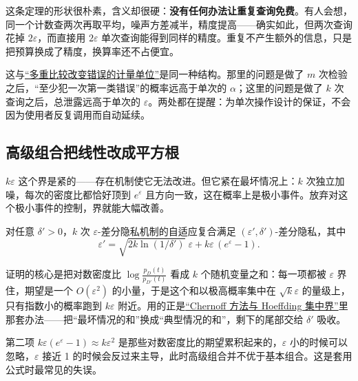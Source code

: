 这条定理的形状很朴素，含义却很硬：\textbf{没有任何办法让重复查询免费}。有人会想，同一个计数查两次再取平均，噪声方差减半，精度提高——确实如此，但两次查询花掉 \(2\varepsilon\)，而直接用 \(2\varepsilon\) 单次查询能得到同样的精度。重复不产生额外的信息，只是把预算换成了精度，换算率还不占便宜。

这与\hyperref[sec:11-Mathematical-Statistics/05-Hypothesis-Testing/04]{``多重比较改变错误的计量单位''}是同一种结构。那里的问题是做了 \(m\) 次检验之后，``至少犯一次第一类错误''的概率远高于单次的 \(\alpha\)；这里的问题是做了 \(k\) 次查询之后，总泄露远高于单次的 \(\varepsilon\)。两处都在提醒：为单次操作设计的保证，不会因为使用者反复调用而自动延续。

\subsection{高级组合把线性改成平方根}

\(k\varepsilon\) 这个界是紧的——存在机制使它无法改进。但它紧在最坏情况上：\(k\) 次独立加噪，每次的密度比都恰好顶到 \(e^{\varepsilon}\) 且方向一致，这在概率上是极小事件。放弃对这个极小事件的控制，界就能大幅改善。

\begin{theorem}[高级组合]
对任意 \(\delta'>0\)，\(k\) 次 \(\varepsilon\)-差分隐私机制的自适应复合满足 \((\varepsilon',\delta')\)-差分隐私，其中
\[
\varepsilon'=\sqrt{2k\ln(1/\delta')}\;\varepsilon+k\varepsilon\,(e^{\varepsilon}-1).
\]
\end{theorem}

证明的核心是把对数密度比 \(\log\frac{p_D(t)}{p_{D'}(t)}\) 看成 \(k\) 个随机变量之和：每一项都被 \(\varepsilon\) 界住，期望是一个 \(O(\varepsilon^2)\) 的小量，于是这个和以极高概率集中在 \(\sqrt{k}\varepsilon\) 的量级上，只有指数小的概率跑到 \(k\varepsilon\) 附近。用的正是\hyperref[sec:05-Probability/07-Transforms-and-Bounds/04]{``Chernoff 方法与 Hoeffding 集中界''}里那套办法——把``最坏情况的和''换成``典型情况的和''，剩下的尾部交给 \(\delta'\) 吸收。

第二项 \(k\varepsilon(e^{\varepsilon}-1)\approx k\varepsilon^2\) 是那些对数密度比的期望累积起来的，\(\varepsilon\) 小的时候可以忽略，\(\varepsilon\) 接近 1 的时候会反过来主导，此时高级组合并不优于基本组合。这是套用公式时最常见的失误。

